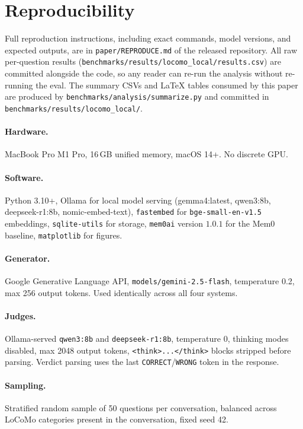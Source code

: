 \section{Reproducibility}
\label{app:reproduce}

Full reproduction instructions, including exact commands, model versions, and expected outputs, are in \texttt{paper/REPRODUCE.md} of the released repository. All raw per-question results (\texttt{benchmarks/results/locomo\_local/results.csv}) are committed alongside the code, so any reader can re-run the analysis without re-running the eval. The summary CSVs and LaTeX tables consumed by this paper are produced by \texttt{benchmarks/analysis/summarize.py} and committed in \texttt{benchmarks/results/locomo\_local/}.

\paragraph{Hardware.} MacBook Pro M1 Pro, 16\,GB unified memory, macOS 14+. No discrete GPU.

\paragraph{Software.} Python 3.10+, Ollama for local model serving (gemma4:latest, qwen3:8b, deepseek-r1:8b, nomic-embed-text), \texttt{fastembed} for \texttt{bge-small-en-v1.5} embeddings, \texttt{sqlite-utils} for storage, \texttt{mem0ai} version $1.0.1$ for the Mem0 baseline, \texttt{matplotlib} for figures.

\paragraph{Generator.} Google Generative Language API, \texttt{models/gemini-2.5-flash}, temperature 0.2, max 256 output tokens. Used identically across all four systems.

\paragraph{Judges.} Ollama-served \texttt{qwen3:8b} and \texttt{deepseek-r1:8b}, temperature 0, thinking modes disabled, max 2048 output tokens, \texttt{<think>...</think>} blocks stripped before parsing. Verdict parsing uses the last \texttt{CORRECT}/\texttt{WRONG} token in the response.

\paragraph{Sampling.} Stratified random sample of 50 questions per conversation, balanced across LoCoMo categories present in the conversation, fixed seed 42.

